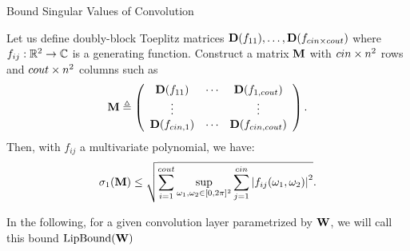 %
%


\begin{frame}{Bound Singular Values of Convolution}

  \begin{theorem}
    Let us define doubly-block Toeplitz matrices $\mathbf{D}(f_{11}), \dots, \mathbf{D}(f_{cin\times cout})$ where $f_{ij}: {\mathbb{R}}^2 \rightarrow {\ensuremath \mathbb{C}}$ is a generating function. Construct a matrix $\mathbf{M}$ with $cin\times n^2$ rows and $cout\times n^2$ columns such as
    {\small
    \begin{equation*}
	\mathbf{M} \triangleq  \left(\begin{array}{ccc}
	\mathbf{D}(f_{11}) & \cdots & \mathbf{D}(f_{1,cout})   \\
	\vdots & & \vdots   \\
	\mathbf{D}(f_{cin,1}) & \cdots & \mathbf{D}(f_{cin,cout}) \\
	\end{array}\right) .
    \end{equation*}
    }
    Then, with $f_{ij}$ a multivariate polynomial, we have:
    \begin{equation*}
       \sigma_1(\mathbf{M}) \leq \sqrt{ \sum_{i=1}^{cout} \sup_{\omega_1, \omega_2 \in [0, 2\pi]^2} \sum_{j = 1}^{cin} \left|f_{ij}(\omega_1, \omega_2) \right|^2 } .
    \end{equation*}
  \end{theorem}

  In the following, for a given convolution layer parametrized by $\mathbf{W}$, we will call this bound $\operatorname*{LipBound}(\mathbf{W})$

\end{frame}



